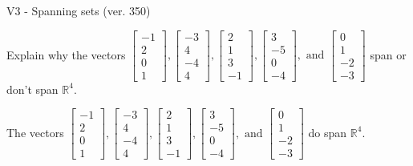 \begin{exercise}
  \begin{exerciseTitle}V3 - Spanning sets (ver. 350)\end{exerciseTitle}
  \begin{exerciseStatement}
    Explain why the vectors \(\left[\begin{array}{r}
-1 \\
2 \\
0 \\
1
\end{array}\right] , \left[\begin{array}{r}
-3 \\
4 \\
-4 \\
4
\end{array}\right] , \left[\begin{array}{r}
2 \\
1 \\
3 \\
-1
\end{array}\right] , \left[\begin{array}{r}
3 \\
-5 \\
0 \\
-4
\end{array}\right] , \text{ and } \left[\begin{array}{r}
0 \\
1 \\
-2 \\
-3
\end{array}\right]\) span or don't span \(\mathbb{R}^4\). 
	


  \end{exerciseStatement}
  \begin{exerciseAnswer}
   The vectors \(\left[\begin{array}{r}
-1 \\
2 \\
0 \\
1
\end{array}\right] , \left[\begin{array}{r}
-3 \\
4 \\
-4 \\
4
\end{array}\right] , \left[\begin{array}{r}
2 \\
1 \\
3 \\
-1
\end{array}\right] , \left[\begin{array}{r}
3 \\
-5 \\
0 \\
-4
\end{array}\right] , \text{ and } \left[\begin{array}{r}
0 \\
1 \\
-2 \\
-3
\end{array}\right]\) 
  	 do  
	span \(\mathbb{R}^4\).
  



\end{exerciseAnswer}
\end{exercise}
